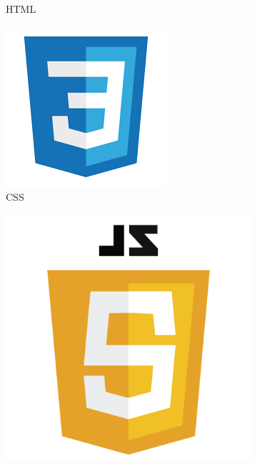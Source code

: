 \begin{figure}[!tbp]
\begin{subfigure}[b]{0.10\textwidth}
		\caption{HTML}
	\end{subfigure}
	\hfill
	\begin{subfigure}[b]{0.1\textwidth}
		\includegraphics[width=\textwidth, height=\textwidth]{imagenes/software_usado/icono_css.png}
		\caption{CSS}
	\end{subfigure}
	\hfill
	\begin{subfigure}[b]{0.1\textwidth}
		\includegraphics[width=\textwidth, height=\textwidth]{imagenes/software_usado/icono_javascript.png}

\end{subfigure}
\end{figure}
